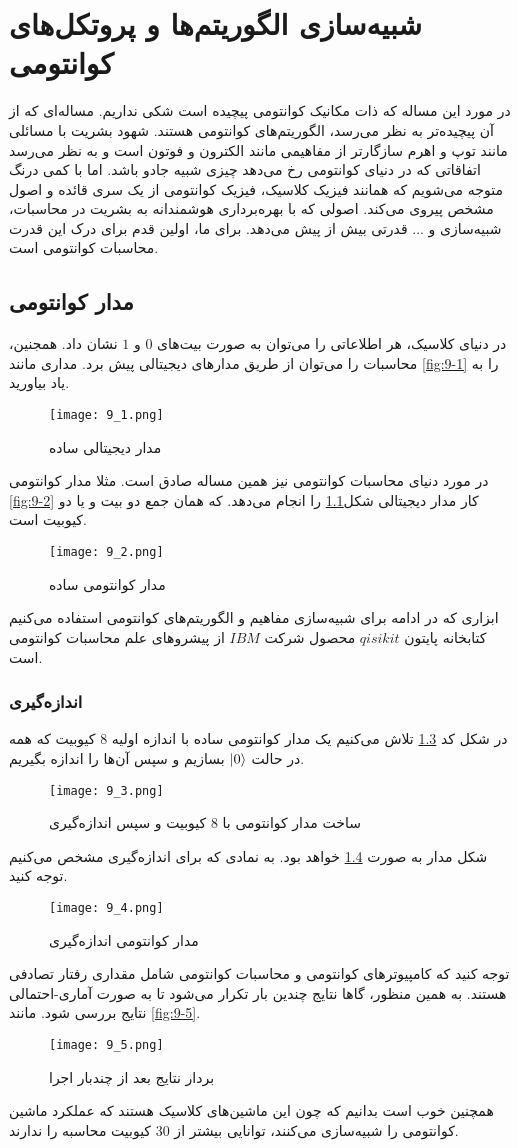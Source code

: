 \chapter{شبیه‌سازی الگوریتم‌ها و پروتکل‌های کوانتومی}
در مورد این مساله که ذات مکانیک کوانتومی پیچیده است شکی نداریم. مساله‌ای که از آن پیچیده‌تر به نظر می‌رسد، الگوریتم‌های کوانتومی هستند. شهود بشریت با مسائلی مانند توپ و اهرم سازگارتر از مفاهیمی مانند الکترون و فوتون است و به نظر می‌رسد اتفاقاتی که در دنیای کوانتومی رخ می‌دهد چیزی شبیه جادو باشد. اما با کمی درنگ متوجه می‌شویم که همانند فیزیک کلاسیک، فیزیک کوانتومی از یک سری قائده و اصول مشخص پیروی می‌کند. اصولی که با بهره‌برداری هوشمندانه به بشریت در محاسبات، شبیه‌سازی و ... قدرتی بیش از پیش می‌دهد. برای ما، اولین قدم برای درک این قدرت محاسبات کوانتومی است. 
\section{مدار کوانتومی}
در دنیای کلاسیک، هر اطلاعاتی را می‌توان به صورت بیت‌های $0$ و $1$ نشان داد. همجنین، محاسبات را می‌توان از طریق مدارهای دیجیتالی پیش‌ برد. مداری مانند \autoref{fig:9-1} را به یاد بیاورید. 
\begin{figure}[h]
	\caption{مدار دیجیتالی ساده}
	\centering
	\texttt{[image: 9\_1.png]}
	\label{fig:9-1}
\end{figure}
در مورد دنیای محاسبات کوانتومی نیز همین مساله صادق است. مثلا مدار کوانتومی \autoref{fig:9-2} کار مدار دیجیتالی شکل\ref{fig:9-1} را انجام می‌دهد. که همان جمع دو بیت و یا دو کیوبیت است. 
\begin{figure}[h]
	\caption{مدار کوانتومی ساده}
	\centering
	\texttt{[image: 9\_2.png]}
	\label{fig:9-2}
\end{figure}
ابزاری که در ادامه برای شبیه‌سازی مفاهیم و الگوریتم‌های کوانتومی استفاده می‌کنیم کتابخانه پایتون $qisikit$
\cite{Qiskit}  محصول شرکت $IBM$ از پیشروهای علم محاسبات کوانتومی است. 
\subsection{اندازه‌گیری}
در شکل کد \ref{fig:9-3} تلاش می‌کنیم یک مدار کوانتومی ساده با اندازه اولیه $8$ کیوبیت که همه در حالت $\ket{0}$ بسازیم و سپس آن‌ها را اندازه بگیریم. 
\begin{figure}[h]
	\caption{ساخت مدار کوانتومی با $8$ کیوبیت و سپس اندازه‌گیری}
	\centering
	\texttt{[image: 9\_3.png]}
	\label{fig:9-3}
\end{figure}
شکل مدار به صورت \ref{fig:9-4} خواهد بود. به نمادی که برای اندازه‌گیری مشخص می‌کنیم توجه کنید. 
 \begin{figure}[h]
	\caption{مدار کوانتومی اندازه‌گیری}
	\centering
	\texttt{[image: 9\_4.png]}
	\label{fig:9-4}
\end{figure}
توجه کنید که کامپیوتر‌های کوانتومی و محاسبات کوانتومی شامل مقداری رفتار تصادفی هستند. به همین منظور، گاها نتایج چندین بار تکرار می‌شود تا به صورت آماری-احتمالی نتایج بررسی شود. مانند \autoref{fig:9-5}.
 \begin{figure}[h]
	\caption{بردار نتایج  بعد از چندبار اجرا}
	\centering
	\texttt{[image: 9\_5.png]}
	\label{fig:9-5}
\end{figure}
همچنین خوب است بدانیم که چون این ماشین‌های کلاسیک هستند که عملکرد ماشین کوانتومی را شبیه‌سازی می‌کنند، توانایی بیشتر از $30$ کیوبیت محاسبه را ندارند. 
